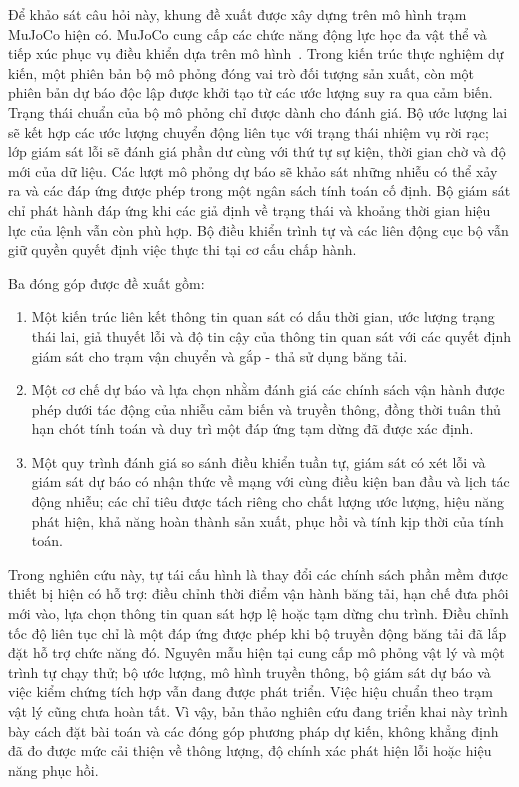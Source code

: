 Để khảo sát câu hỏi này, khung đề xuất được xây dựng trên mô hình trạm MuJoCo hiện có. MuJoCo cung cấp các chức năng động lực học đa vật thể và tiếp xúc phục vụ điều khiển dựa trên mô hình~\cite{Todorov2012}. Trong kiến trúc thực nghiệm dự kiến, một phiên bản bộ mô phỏng đóng vai trò đối tượng sản xuất, còn một phiên bản dự báo độc lập được khởi tạo từ các ước lượng suy ra qua cảm biến. Trạng thái chuẩn của bộ mô phỏng chỉ được dành cho đánh giá. Bộ ước lượng lai sẽ kết hợp các ước lượng chuyển động liên tục với trạng thái nhiệm vụ rời rạc; lớp giám sát lỗi sẽ đánh giá phần dư cùng với thứ tự sự kiện, thời gian chờ và độ mới của dữ liệu. Các lượt mô phỏng dự báo sẽ khảo sát những nhiễu có thể xảy ra và các đáp ứng được phép trong một ngân sách tính toán cố định. Bộ giám sát chỉ phát hành đáp ứng khi các giả định về trạng thái và khoảng thời gian hiệu lực của lệnh vẫn còn phù hợp. Bộ điều khiển trình tự và các liên động cục bộ vẫn giữ quyền quyết định việc thực thi tại cơ cấu chấp hành.

Ba đóng góp được đề xuất gồm:
\begin{enumerate}
  \item Một kiến trúc liên kết thông tin quan sát có dấu thời gian, ước lượng trạng thái lai, giả thuyết lỗi và độ tin cậy của thông tin quan sát với các quyết định giám sát cho trạm vận chuyển và gắp - thả sử dụng băng tải.
  \item Một cơ chế dự báo và lựa chọn nhằm đánh giá các chính sách vận hành được phép dưới tác động của nhiễu cảm biến và truyền thông, đồng thời tuân thủ hạn chót tính toán và duy trì một đáp ứng tạm dừng đã được xác định.
  \item Một quy trình đánh giá so sánh điều khiển tuần tự, giám sát có xét lỗi và giám sát dự báo có nhận thức về mạng với cùng điều kiện ban đầu và lịch tác động nhiễu; các chỉ tiêu được tách riêng cho chất lượng ước lượng, hiệu năng phát hiện, khả năng hoàn thành sản xuất, phục hồi và tính kịp thời của tính toán.
\end{enumerate}

Trong nghiên cứu này, tự tái cấu hình là thay đổi các chính sách phần mềm được thiết bị hiện có hỗ trợ: điều chỉnh thời điểm vận hành băng tải, hạn chế đưa phôi mới vào, lựa chọn thông tin quan sát hợp lệ hoặc tạm dừng chu trình. Điều chỉnh tốc độ liên tục chỉ là một đáp ứng được phép khi bộ truyền động băng tải đã lắp đặt hỗ trợ chức năng đó. Nguyên mẫu hiện tại cung cấp mô phỏng vật lý và một trình tự chạy thử; bộ ước lượng, mô hình truyền thông, bộ giám sát dự báo và việc kiểm chứng tích hợp vẫn đang được phát triển. Việc hiệu chuẩn theo trạm vật lý cũng chưa hoàn tất. Vì vậy, bản thảo nghiên cứu đang triển khai này trình bày cách đặt bài toán và các đóng góp phương pháp dự kiến, không khẳng định đã đo được mức cải thiện về thông lượng, độ chính xác phát hiện lỗi hoặc hiệu năng phục hồi.
